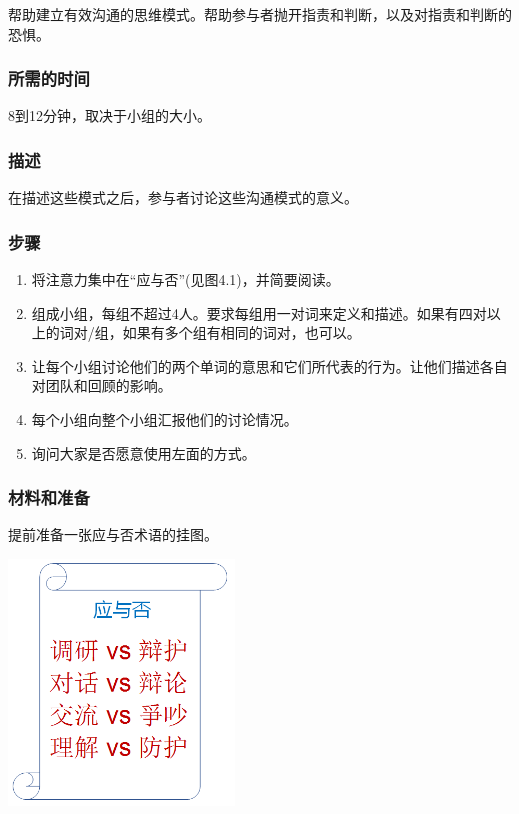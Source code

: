 帮助建立有效沟通的思维模式。帮助参与者抛开指责和判断，以及对指责和判断的恐惧。

\hypertarget{ux6240ux9700ux7684ux65f6ux95f4}{%
\subsubsection{所需的时间}\label{ux6240ux9700ux7684ux65f6ux95f4}}

8到12分钟，取决于小组的大小。

\hypertarget{ux63cfux8ff0}{%
\subsubsection{描述}\label{ux63cfux8ff0}}

在描述这些模式之后，参与者讨论这些沟通模式的意义。

\hypertarget{ux6b65ux9aa4}{%
\subsubsection{步骤}\label{ux6b65ux9aa4}}

\begin{enumerate}
\tightlist
\item
  将注意力集中在``应与否''(见图4.1)，并简要阅读。
\item
  组成小组，每组不超过4人。要求每组用一对词来定义和描述。如果有四对以上的词对/组，如果有多个组有相同的词对，也可以。
\item
  让每个小组讨论他们的两个单词的意思和它们所代表的行为。让他们描述各自对团队和回顾的影响。
\item
  每个小组向整个小组汇报他们的讨论情况。
\item
  询问大家是否愿意使用左面的方式。
\end{enumerate}

\hypertarget{ux6750ux6599ux548cux51c6ux5907}{%
\subsubsection{材料和准备}\label{ux6750ux6599ux548cux51c6ux5907}}

提前准备一张应与否术语的挂图。



\includegraphics[width=6cm]{Derby_42.png}


